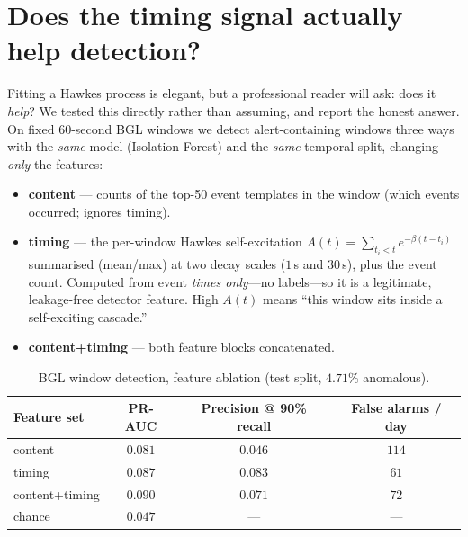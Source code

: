 \documentclass[11pt,a4paper]{article}
\begin{document}
\section{Does the timing signal actually help detection?}
\label{sec:ablation}

Fitting a Hawkes process is elegant, but a professional reader will ask: does it
\emph{help}? We tested this directly rather than assuming, and report the honest
answer. On fixed 60-second BGL windows we detect alert-containing windows three
ways with the \emph{same} model (Isolation Forest) and the \emph{same} temporal
split, changing \emph{only} the features:

\begin{itemize}[nosep,leftmargin=1.5em]
  \item \textbf{content} --- counts of the top-50 event templates in the window
  (which events occurred; ignores timing).
  \item \textbf{timing} --- the per-window Hawkes self-excitation
  $A(t)=\sum_{t_i<t}e^{-\beta(t-t_i)}$ summarised (mean/max) at two decay scales
  ($1$\,s and $30$\,s), plus the event count. Computed from event \emph{times
  only}---no labels---so it is a legitimate, leakage-free detector feature. High
  $A(t)$ means ``this window sits inside a self-exciting cascade.''
  \item \textbf{content+timing} --- both feature blocks concatenated.
\end{itemize}

\begin{table}[H]
\centering
\caption{BGL window detection, feature ablation (test split, $4.71\%$ anomalous).}
\label{tab:ablation}
\small
\renewcommand{\arraystretch}{1.15}
\begin{tabular}{@{}l c c c@{}}
\toprule
Feature set & PR-AUC & Precision @ 90\% recall & False alarms / day \\
\midrule
content & $0.081$ & $0.046$ & $114$ \\
\rowcolor{keybg}\color{good}timing & \color{good}$0.087$ & \color{good}$0.083$ & \color{good}$61$ \\
content+timing & $0.090$ & $0.071$ & $72$ \\
chance & $0.047$ & --- & --- \\
\bottomrule
\end{tabular}
\end{table}
\end{document}
